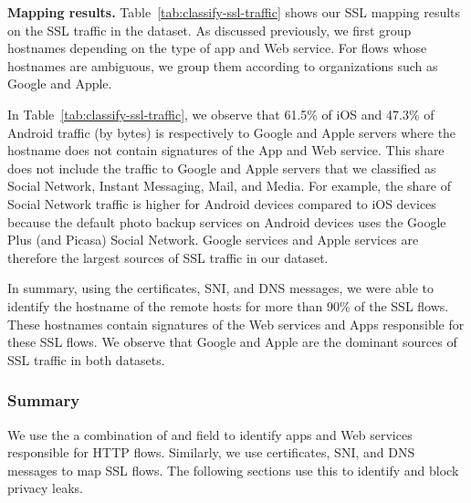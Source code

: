 \noindent\textbf{Mapping results.} 
Table~\ref{tab:classify-ssl-traffic} shows our SSL mapping results on the SSL traffic in the \mobWild dataset. 
As discussed previously, we first group hostnames depending on the type of app and Web service.
For flows whose hostnames are ambiguous, we group them according to organizations such as Google and Apple.

In Table~\ref{tab:classify-ssl-traffic}, we observe that 61.5\% of iOS and 47.3\% of Android traffic (by bytes) is respectively 
to Google and Apple servers where the hostname does not contain signatures of the App and Web service.
This share does not include the traffic to Google and Apple servers that we classified as Social Network, Instant Messaging, Mail, and Media.
For example, the share of Social Network traffic is higher for Android devices compared to iOS devices because the default photo backup services on Android devices uses the Google Plus (and Picasa) Social Network.
Google services and Apple services are therefore the largest sources of SSL traffic in our \mobWild dataset.

In summary, using the certificates, SNI, and DNS messages, we were able to identify the hostname of the remote hosts for more than 90\% of the SSL flows.
These hostnames contain signatures of the Web services and Apps responsible for these SSL flows.
We observe that Google and Apple are the dominant sources of SSL traffic in both datasets.

\subsubsection{Summary}

We use the a combination of \useragent and \httphost field to identify apps and Web services responsible for HTTP flows.
Similarly, we use certificates, SNI, and DNS messages to map SSL flows.
The following sections use this to identify and block privacy leaks.




